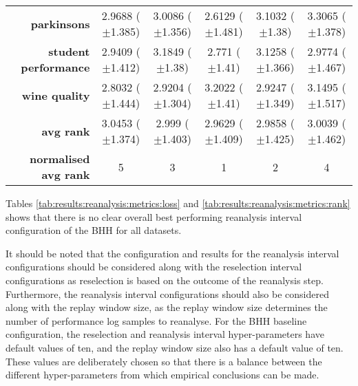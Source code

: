 \begin{table}[htb]
{\begin{tabular}{r|ccccc}
                  \textbf{parkinsons}          & \cellcolor[rgb]{ .937,  .902,  .514}2.9688 ($\pm$1.385) & \cellcolor[rgb]{ 1,  .922,  .518}3.0086 ($\pm$1.356)    & \cellcolor[rgb]{ .388,  .745,  .482}2.6129 ($\pm$1.481) & \cellcolor[rgb]{ .992,  .761,  .49}3.1032 ($\pm$1.38)   & \cellcolor[rgb]{ .973,  .412,  .42}3.3065 ($\pm$1.378)  \\
                  \textbf{student performance} & \cellcolor[rgb]{ .89,  .89,  .51}2.9409 ($\pm$1.412)    & \cellcolor[rgb]{ .973,  .412,  .42}3.1849 ($\pm$1.38)   & \cellcolor[rgb]{ .388,  .745,  .482}2.771 ($\pm$1.41)   & \cellcolor[rgb]{ .98,  .561,  .451}3.1258 ($\pm$1.366)  & \cellcolor[rgb]{ 1,  .922,  .518}2.9774 ($\pm$1.467)    \\
                  \textbf{wine quality}        & \cellcolor[rgb]{ .388,  .745,  .482}2.8032 ($\pm$1.444) & \cellcolor[rgb]{ .976,  .914,  .514}2.9204 ($\pm$1.304) & \cellcolor[rgb]{ .973,  .412,  .42}3.2022 ($\pm$1.41)   & \cellcolor[rgb]{ 1,  .922,  .518}2.9247 ($\pm$1.349)    & \cellcolor[rgb]{ .98,  .51,  .439}3.1495 ($\pm$1.517)   \\
                  \midrule
                  \textbf{avg rank}            & \cellcolor[rgb]{ .973,  .412,  .42}3.0453 ($\pm$1.374)  & \cellcolor[rgb]{ 1,  .922,  .518}2.999 ($\pm$1.403)     & \cellcolor[rgb]{ .388,  .745,  .482}2.9629 ($\pm$1.409) & \cellcolor[rgb]{ .773,  .855,  .502}2.9858 ($\pm$1.425) & \cellcolor[rgb]{ 1,  .871,  .51}3.0039 ($\pm$1.462)     \\
                  \midrule
                  \textbf{normalised avg rank} & \cellcolor[rgb]{ .973,  .412,  .42}5                    & \cellcolor[rgb]{ 1,  .922,  .518}3                      & \cellcolor[rgb]{ .388,  .745,  .482}1                   & \cellcolor[rgb]{ .694,  .831,  .498}2                   & \cellcolor[rgb]{ .988,  .667,  .471}4                   \\
            \end{tabular}%
      }
\end{table}%


Tables \ref{tab:results:reanalysis:metrics:loss} and \ref{tab:results:reanalysis:metrics:rank} shows that there is no clear overall best performing reanalysis interval configuration of the \acs{BHH} for all datasets.

It should be noted that the configuration and results for the reanalysis interval configurations should be considered along with the reselection interval configurations as reselection is based on the outcome of the reanalysis step. Furthermore, the reanalysis interval configurations should also be considered along with the replay window size, as the replay window size determines the number of performance log samples to reanalyse. For the \acs{BHH} baseline configuration, the reselection and reanalysis interval hyper-parameters have default values of ten, and the replay window size also has a default value of ten. These values are deliberately chosen so that there is a balance between the different hyper-parameters from which empirical conclusions can be made.

